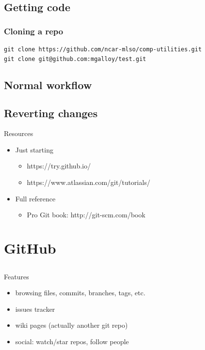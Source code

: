 \documentclass{beamer}
\begin{document}
\subsection{Getting code}
\begin{frame}[fragile]
  \frametitle{Cloning a repo}
  \begin{lstlisting}
git clone https://github.com/ncar-mlso/comp-utilities.git
git clone git@github.com:mgalloy/test.git
  \end{lstlisting}
\end{frame}

\subsection{Normal workflow}

\subsection{Reverting changes}


\begin{frame}{Resources}
  \begin{itemize}
    \item Just starting
      \begin{itemize}
        \item https://try.github.io/
        \item https://www.atlassian.com/git/tutorials/
      \end{itemize}
    \item Full reference
      \begin{itemize}
        \item Pro Git book: http://git-scm.com/book
      \end{itemize}
  \end{itemize}
\end{frame}

\section{GitHub}
\subsection*{}

\begin{frame}{Features}
  \begin{itemize}
    \item browsing files, commits, branches, tags, etc.
    \item issues tracker
    \item wiki pages (actually another git repo)
    \item social: watch/star repos, follow people
  \end{itemize}
\end{frame}
\end{document}
